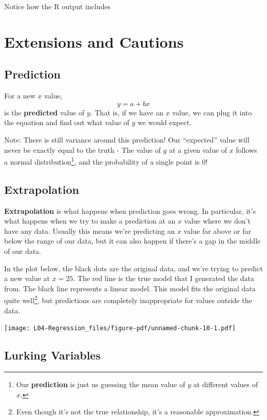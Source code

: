 \documentclass[
  letterpaper,
  DIV=11,
  numbers=noendperiod,
  oneside]{scrreprt}
\begin{document}
Notice how the R output includes

\hypertarget{extensions-and-cautions}{%
\section{Extensions and Cautions}\label{extensions-and-cautions}}

\hypertarget{prediction}{%
\subsection{Prediction}\label{prediction}}

For a new \(x\) value, \[y = a + bx\] is the \textbf{predicted} value of
\(y\). That is, if we have an \(x\) value, we can plug it into the
equation and find out what value of \(y\) we would expect.

Note: There is still variance around this prediction! Our ``expected''
value will never be exactly equal to the truth - The value of \(y\) at a
given value of \(x\) follows a normal distribution\footnote{Our
  \textbf{prediction} is just us guessing the mean value of \(y\) at
  different values of \(x\).}, and the probability of a single point is
0!

\hypertarget{extrapolation}{%
\subsection{Extrapolation}\label{extrapolation}}

\textbf{Extrapolation} is what happens when prediction goes wrong. In
particular, it's what happens when we try to make a prediction at an
\(x\) value where we don't have any data. Usually this means we're
predicting an \(x\) value far above or far below the range of our data,
but it can also happen if there's a gap in the middle of our data.

In the plot below, the black dots are the original data, and we're
trying to predict a new value at \(x = 25\). The red line is the true
model that I generated the data from. The black line represents a linear
model. This model fits the original data quite well\footnote{Even though
  it's not the true relationship, it's a reasonable approximation.}, but
predictions are completely inappropriate for values outside the data.

\texttt{[image: L04-Regression\_files/figure-pdf/unnamed-chunk-10-1.pdf]}

\hypertarget{lurking-variables}{%
\subsection{Lurking Variables}\label{lurking-variables}}
\end{document}
